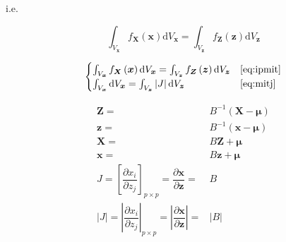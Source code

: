 \documentclass[
]{book}
\theoremstyle{definition}
\theoremstyle{definition}
\theoremstyle{definition}
\theoremstyle{definition}
\theoremstyle{remark}
\begin{document}
i.e.

\begin{equation}
\label{eq:ipmit}
\int_{V_{\boldsymbol{x}}}f_{\boldsymbol{X}}\left(\boldsymbol{x}\right)\mathrm{d}V_{\boldsymbol{x}}=\int_{V_{\boldsymbol{z}}}f_{\boldsymbol{Z}}\left(\boldsymbol{z}\right)\mathrm{d}V_{\boldsymbol{z}}
\end{equation}

\[
\begin{cases}
\int_{V_{\boldsymbol{x}}}f_{\boldsymbol{X}}\left(\boldsymbol{x}\right)\mathrm{d}V_{\boldsymbol{x}}=\int_{V_{\boldsymbol{z}}}f_{\boldsymbol{Z}}\left(\boldsymbol{z}\right)\mathrm{d}V_{\boldsymbol{z}} & \ref{eq:ipmit}\\
\int_{V_{\boldsymbol{x}}}\mathrm{d}V_{\boldsymbol{x}}=\int_{V_{\boldsymbol{z}}}\left|J\right|\mathrm{d}V_{\boldsymbol{z}} & \ref{eq:mitj}
\end{cases}
\]

\begin{align}
\boldsymbol{Z}= & B^{-1}\left(\boldsymbol{X}-\boldsymbol{\mu}\right)\nonumber \\
\boldsymbol{z}= & B^{-1}\left(\boldsymbol{x}-\boldsymbol{\mu}\right) \label{eq:sltx2z}\\
\boldsymbol{X}= & B\boldsymbol{Z}+\boldsymbol{\mu}\nonumber \\
\boldsymbol{x}= & B\boldsymbol{z}+\boldsymbol{\mu}\nonumber \\
J=\left[\dfrac{\partial x_{i}}{\partial z_{j}}\right]_{p\times p}=\dfrac{\partial\boldsymbol{x}}{\partial\boldsymbol{z}}= & B \label{eq:sltj}\\
\left|J\right|=\left|\dfrac{\partial x_{i}}{\partial z_{j}}\right|_{p\times p}=\left|\dfrac{\partial\boldsymbol{x}}{\partial\boldsymbol{z}}\right|= & \left|B\right|\nonumber 
\end{align}
\end{document}
